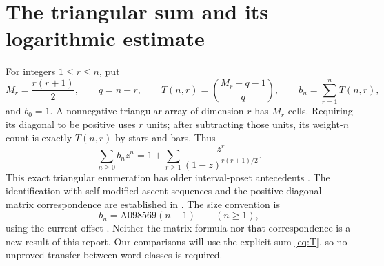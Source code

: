 \section{The triangular sum and its logarithmic estimate}\label{sec:triangular}
For integers $1\le r\le n$, put
\begin{equation}\label{eq:T}
 M_r=\frac{r(r+1)}2,\qquad q=n-r,\qquad
 T(n,r)=\binom{M_r+q-1}{q},\qquad b_n=\sum_{r=1}^n T(n,r),
\end{equation}
and $b_0=1$. A nonnegative triangular array of dimension $r$ has $M_r$ cells. Requiring its diagonal to be positive uses $r$ units; after subtracting those units, its weight-$n$ count is exactly $T(n,r)$ by stars and bars. Thus
\[
 \sum_{n\ge0}b_nz^n=1+\sum_{r\ge1}\frac{z^r}{(1-z)^{r(r+1)/2}}.
\]
This exact triangular enumeration has older interval-poset antecedents \cite{bayoumi,khamis}. The identification with self-modified ascent sequences and the positive-diagonal matrix correspondence are established in \cite{bcdk,dukes}. The size convention is
\begin{equation}\label{eq:shift}
 b_n=\mathrm{A098569}(n-1)\qquad(n\ge1),
\end{equation}
using the current offset \cite{oeistriangular}. Neither the matrix formula nor that correspondence is a new result of this report. Our comparisons will use the explicit sum \eqref{eq:T}, so no unproved transfer between word classes is required.

